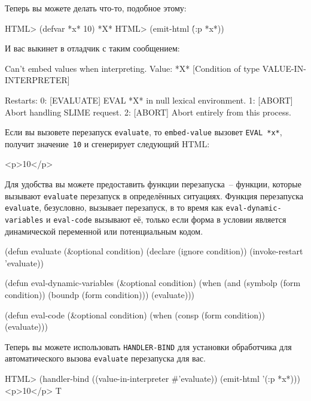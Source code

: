 Теперь вы можете делать что-то, подобное этому:

\begin{myverb}
HTML> (defvar *x* 10)
*X*
HTML> (emit-html \'(:p *x*))
\end{myverb}

\noindent{}И вас выкинет в отладчик с таким сообщением:

\begin{myverb}
Can't embed values when interpreting. Value: *X*
   [Condition of type VALUE-IN-INTERPRETER]

Restarts:
  0: [EVALUATE] EVAL *X* in null lexical environment.
  1: [ABORT] Abort handling SLIME request.
  2: [ABORT] Abort entirely from this process.
\end{myverb}

Если вы вызовете перезапуск \lstinline{evaluate}, то \lstinline{embed-value} вызовет
\lstinline{EVAL *x*}, получит значение~\lstinline{10} и сгенерирует следующий HTML:

\begin{myverb}
<p>10</p>
\end{myverb}

Для удобства вы можете предоставить функции перезапуска~-- функции, которые вызывают
\lstinline{evaluate} перезапуск в определённых ситуациях. Функция перезапуска
\lstinline{evaluate}, безусловно, вызывает перезапуск, в то время как
\lstinline{eval-dynamic-variables} и \lstinline{eval-code} вызывают её, только если форма в
условии является динамической переменной или потенциальным кодом.

\begin{myverb}
(defun evaluate (\&{}optional condition)
  (declare (ignore condition))
  (invoke-restart 'evaluate))

(defun eval-dynamic-variables (\&{}optional condition)
  (when (and (symbolp (form condition)) (boundp (form condition)))
    (evaluate)))

(defun eval-code (\&{}optional condition)
  (when (consp (form condition))
    (evaluate)))
\end{myverb}

Теперь вы можете использовать \lstinline{HANDLER-BIND} для установки обработчика для
автоматического вызова \lstinline{evaluate} перезапуска для вас.

\begin{myverb}
HTML> (handler-bind ((value-in-interpreter \#{}'evaluate)) (emit-html '(:p *x*)))
<p>10</p>
T
\end{myverb}

